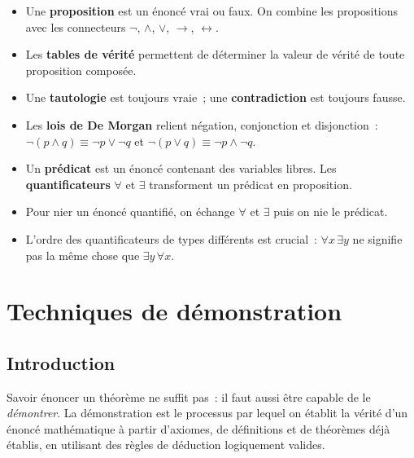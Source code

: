 \documentclass[12pt,a4paper,openany]{book}
\theoremstyle{definition}
\theoremstyle{plain}
\theoremstyle{remark}
\begin{document}
\begin{itemize}[leftmargin=2em]
  \item Une \textbf{proposition} est un \'enonc\'e vrai ou faux. On combine les propositions avec les connecteurs $\neg$, $\land$, $\lor$, $\to$, $\leftrightarrow$.
  \item Les \textbf{tables de v\'erit\'e} permettent de d\'eterminer la valeur de v\'erit\'e de toute proposition compos\'ee.
  \item Une \textbf{tautologie} est toujours vraie~; une \textbf{contradiction} est toujours fausse.
  \item Les \textbf{lois de De Morgan} relient n\'egation, conjonction et disjonction~: $\neg(p \land q) \equiv \neg p \lor \neg q$ et $\neg(p \lor q) \equiv \neg p \land \neg q$.
  \item Un \textbf{pr\'edicat} est un \'enonc\'e contenant des variables libres. Les \textbf{quantificateurs} $\forall$ et $\exists$ transforment un pr\'edicat en proposition.
  \item Pour nier un \'enonc\'e quantifi\'e, on \'echange $\forall$ et $\exists$ puis on nie le pr\'edicat.
  \item L'ordre des quantificateurs de types diff\'erents est crucial~: $\forall x\, \exists y$ ne signifie pas la m\^eme chose que $\exists y\, \forall x$.
\end{itemize}


\chapter{Techniques de d\'emonstration}
\label{ch:demonstration}

\section*{Introduction}

Savoir \'enoncer un th\'eor\`eme ne suffit pas~: il faut aussi \^etre capable de le \emph{d\'emontrer}. La d\'emonstration est le processus par lequel on \'etablit la v\'erit\'e d'un \'enonc\'e math\'ematique \`a partir d'axiomes, de d\'efinitions et de th\'eor\`emes d\'ej\`a \'etablis, en utilisant des r\`egles de d\'eduction logiquement valides.
\end{document}
